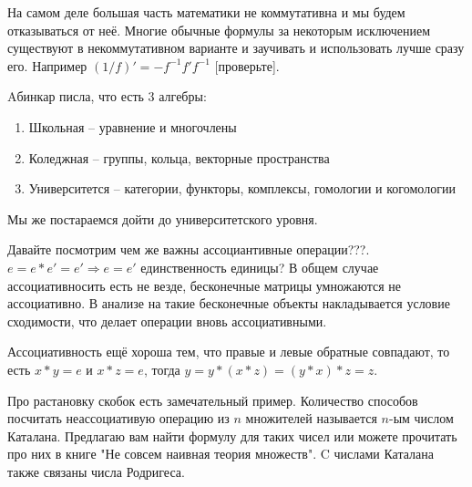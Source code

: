 На самом деле большая часть математики не коммутативна и мы будем отказываться
от неё. Многие обычные формулы за некоторым исключением существуют в
некоммутативном варианте и заучивать и использовать лучше сразу его. Например
$(1/f)' = -f^{-1}f'f^{-1}$ [проверьте]. 

Aбинкар писла, что есть 3 алгебры:
\begin{enumerate}
    \item Школьная – уравнение и многочлены
    \item Коледжная – группы, кольца, векторные пространства
    \item Университется – категории, функторы, комплексы, гомологии и когомологии
\end{enumerate}
Мы же постараемся дойти до университетского уровня.

Давайте посмотрим чем же важны ассоциантивные операции???. $e = e*e' = e'
\Rightarrow e=e'$ единственность единицы? В общем случае ассоциативносить
есть не везде, бесконечные матрицы умножаются не ассоциативно. В анализе на
такие бесконечные объекты накладывается условие сходимости, что делает операции
вновь ассоциативными.

Ассоциативность ещё хороша тем, что правые и левые обратные совпадают, то есть
$x*y=e$ и $x*z=e$, тогда $y=y*(x*z)=(y*x)*z=z$.

Про растановку скобок есть замечательный пример. Количество способов посчитать
неассоциативую операцию из $n$ множителей называется $n$-ым числом Каталана.
Предлагаю вам найти формулу для таких чисел или можете прочитать про них в
книге "Не совсем наивная теория множеств". C числами Каталана также связаны
числа Родригеса.
